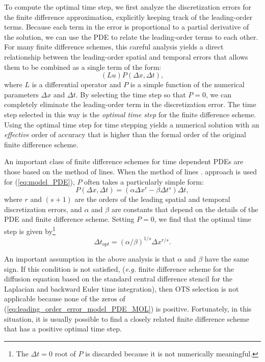 \documentclass[fleqn,12pt,twoside]{article}
\newcommand{\beq}{\begin{equation}}
\newcommand{\eeq}{\end{equation}}
\def\dt{\Delta t}
\def\dx{\Delta x}
\def\dto{\dt_{opt}}
\def\eg{\emph{e.g. }}
\begin{document}
To compute the optimal time step, we first analyze the discretization errors 
for the finite difference approximation, explicitly keeping track of the
leading-order terms.  Because each term in the error is proportional to a
partial derivative of the solution, we can use the PDE to relate the
leading-order terms to each other.  For many finite difference schemes, this
careful analysis yields a direct relationship between the leading-order spatial
and temporal errors that allows them to be combined as a single term of the
form:
\beq
  (L u) P(\dx, \dt) ,
  \label{eq:leading_order_error_model_PDE_general}
\eeq
where $L$ is a differential operator and $P$ is a simple function of the 
numerical parameters $\dx$ and $\dt$.  By selecting the time step
so that $P = 0$, we can completely eliminate the leading-order term in the 
discretization error.  The time step selected in this way is the
\emph{optimal time step} for the finite difference scheme.  Using the optimal
time step for time stepping yields a numerical solution with an
\emph{effective} order of accuracy that is higher than the formal order of the
original finite difference scheme.

An important class of finite difference schemes for time dependent PDEs are 
those based on the method of lines.   When the method of 
lines \cite{iserles_book,gko_book,cash_1996,psihoyios_2007}.  
approach is 
used for (\ref{eq:model_PDE}), $P$ often takes a particularly simple 
form:
\beq
  P(\dx, \dt) = (\alpha \dx^r - \beta \dt^s) \dt,
  \label{eq:leading_order_error_model_PDE_MOL}
\eeq
where $r$ and $(s+1)$ are the orders of the leading spatial and temporal 
discretization errors, and $\alpha$ and $\beta$ are constants that 
depend on the details of the PDE and finite difference scheme.  Setting 
$P = 0$, we find that the optimal time step is given by\footnote{The $\dt = 0$ 
root of $P$ is discarded because it is not numerically meaningful.}
\beq
  \dto = \left(\alpha/\beta \right)^{1/s} \dx^{r/s}.
  \label{eq:optimal_time_step}
\eeq

An important assumption in the above analysis is that $\alpha$ and $\beta$ 
have the same sign.  If this condition is not satisfied, (\eg finite
difference scheme for the diffusion equation based on the standard central
difference stencil for the Laplacian and backward Euler time integration),
then OTS selection is not applicable because none of the zeros of 
(\ref{eq:leading_order_error_model_PDE_MOL}) is positive.  Fortunately, 
in this situation, it is usually possible to find a closely related finite 
difference scheme that has a positive optimal time step.
\end{document}
